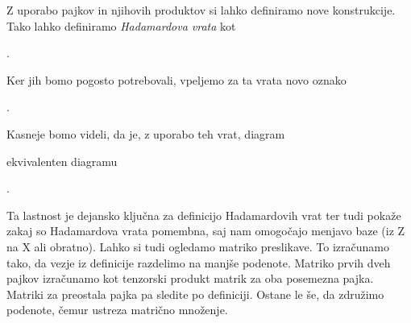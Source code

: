 \documentclass[mat1]{fmfdelo}
\begin{document}
Z uporabo pajkov in njihovih produktov si lahko definiramo nove konstrukcije. Tako lahko definiramo \emph{Hadamardova vrata} kot
\begin{center}
    .
\end{center}
Ker jih bomo pogosto potrebovali, vpeljemo za ta vrata novo oznako
\begin{center}
    .
\end{center}
Kasneje bomo videli, da je, z uporabo teh vrat, diagram
\begin{center}
\end{center}
ekvivalenten diagramu
\begin{center}
    .
\end{center}
Ta lastnost je dejansko ključna za definicijo Hadamardovih vrat ter tudi pokaže zakaj so Hadamardova vrata pomembna, saj nam omogočajo menjavo baze (iz Z na X ali obratno). Lahko si tudi ogledamo matriko preslikave. To izračunamo tako, da vezje iz definicije razdelimo na manjše podenote. Matriko prvih dveh pajkov izračunamo kot tenzorski produkt matrik za oba posemezna pajka. Matriki za preostala pajka pa sledite po definiciji. Ostane le še, da združimo podenote, čemur ustreza matrično množenje.
\end{document}
